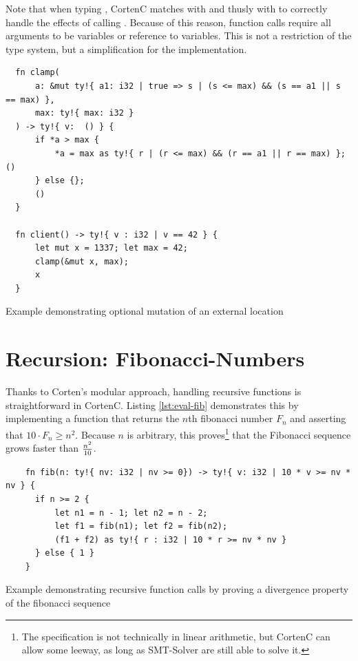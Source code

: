 \documentclass[twoside, english]{sdqthesis}
\theoremstyle{definition}
\begin{document}
Note that when typing , CortenC matches  with  and thusly  with  to correctly handle the effects of calling . Because of this reason, function calls require all arguments to be variables or reference to variables. This is not a restriction of the type system, but a simplification for the implementation.

\begin{listing}[h]
  \begin{verbatim}
  fn clamp(
      a: &mut ty!{ a1: i32 | true => s | (s <= max) && (s == a1 || s == max) }, 
      max: ty!{ max: i32 }
  ) -> ty!{ v:  () } {
      if *a > max {
          *a = max as ty!{ r | (r <= max) && (r == a1 || r == max) }; ()
      } else {};
      ()
  }

  fn client() -> ty!{ v : i32 | v == 42 } {
      let mut x = 1337; let max = 42;
      clamp(&mut x, max);
      x
  }
  \end{verbatim}
  \caption{Example demonstrating optional mutation of an external location}
  \label{lst:eval-clamp}
\end{listing}

\section{Recursion: Fibonacci-Numbers}\label{sec:eval-fibonacci}

Thanks to Corten's modular approach, handling recursive functions is straightforward in CortenC. Listing \ref{lst:eval-fib} demonstrates this by implementing a function that returns the $n$th fibonacci number $F_n$ and asserting that $10\cdot F_n \geq n^2$. Because $n$ is arbitrary, this proves\footnote{The specification is not technically in linear arithmetic, but CortenC can allow some leeway, as long as SMT-Solver are still able to solve it.} that the Fibonacci sequence grows faster than $n^2\over10$.


\begin{listing}[h]
  \begin{verbatim}
    fn fib(n: ty!{ nv: i32 | nv >= 0}) -> ty!{ v: i32 | 10 * v >= nv * nv } {
      if n >= 2 {
          let n1 = n - 1; let n2 = n - 2;
          let f1 = fib(n1); let f2 = fib(n2);
          (f1 + f2) as ty!{ r : i32 | 10 * r >= nv * nv }
      } else { 1 }
    }
  \end{verbatim}
  \caption{Example demonstrating recursive function calls by proving a divergence property of the fibonacci sequence}
  \label{lst:eval-fib}
\end{listing}
\end{document}
